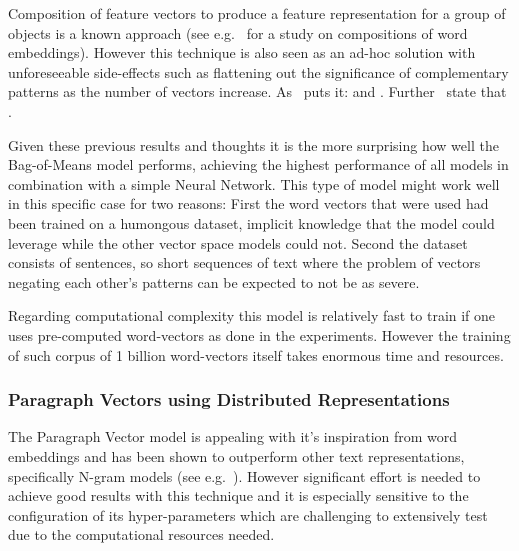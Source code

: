 Composition of feature vectors to produce a feature representation for a group of objects is a known approach (see e.g.~\cite{Mitchell:2010aa} for a study on compositions of word embeddings). However this technique is also seen as an ad-hoc solution with unforeseeable side-effects such as flattening out the significance of complementary patterns as the number of vectors increase. As~\cite{Zhang:2015aa} puts it:  and . Further~\cite{Le:2014aa} state that .

Given these previous results and thoughts it is the more surprising how well the Bag-of-Means model performs, achieving the highest performance of all models in combination with a simple \gls{Neural Network}. This type of model might work well in this specific case for two reasons:
First the word vectors that were used had been trained on a humongous dataset, implicit knowledge that the model could leverage while the other vector space models could not. Second the dataset consists of sentences, so short sequences of text where the problem of vectors negating each other's patterns can be expected to not be as severe.

Regarding computational complexity this model is relatively fast to train if one uses pre-computed word-vectors as done in the experiments. However the training of such corpus of 1 billion word-vectors itself takes enormous time and resources.


\subsubsection{Paragraph Vectors using Distributed Representations}

The Paragraph Vector model is appealing with it's inspiration from word embeddings and has been shown to outperform other text representations, specifically N-gram models (see e.g.~\cite{Le:2014aa}). However significant effort is needed to achieve good results with this technique and it is especially sensitive to the configuration of its hyper-parameters which are challenging to extensively test due to the computational resources needed.

